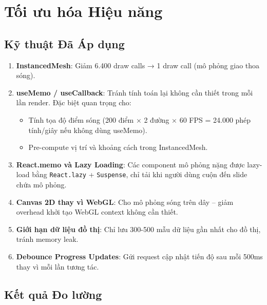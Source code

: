 \section{Tối ưu hóa Hiệu năng}

\subsection{Kỹ thuật Đã Áp dụng}

\begin{enumerate}
    \item \textbf{InstancedMesh}: Giảm 6.400 draw calls → 1 draw call (mô phỏng giao thoa sóng).
    
    \item \textbf{useMemo / useCallback}: Tránh tính toán lại không cần thiết trong mỗi lần render. Đặc biệt quan trọng cho:
    \begin{itemize}
        \item Tính tọa độ điểm sóng (200 điểm × 2 đường × 60 FPS = 24.000 phép tính/giây nếu không dùng useMemo).
        \item Pre-compute vị trí và khoảng cách trong InstancedMesh.
    \end{itemize}
    
    \item \textbf{React.memo và Lazy Loading}: Các component mô phỏng nặng được lazy-load bằng \texttt{React.lazy} + \texttt{Suspense}, chỉ tải khi người dùng cuộn đến slide chứa mô phỏng.
    
    \item \textbf{Canvas 2D thay vì WebGL}: Cho mô phỏng sóng trên dây – giảm overhead khởi tạo WebGL context không cần thiết.
    
    \item \textbf{Giới hạn dữ liệu đồ thị}: Chỉ lưu 300-500 mẫu dữ liệu gần nhất cho đồ thị, tránh memory leak.
    
    \item \textbf{Debounce Progress Updates}: Gửi request cập nhật tiến độ sau mỗi 500ms thay vì mỗi lần tương tác.
\end{enumerate}

\subsection{Kết quả Đo lường}

